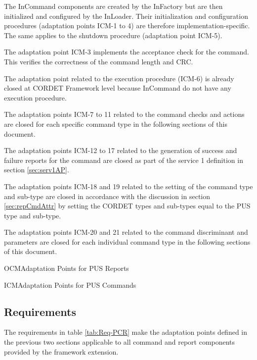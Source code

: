 \documentclass[a4paper,10pt]{article}
\newenvironment{fw_itemize}						%
{\begin{itemize}
  \setlength{\itemsep}{1mm}
  \setlength{\parskip}{0pt}
  \setlength{\parsep}{0pt}}
{\end{itemize}}
\newenvironment{cr_ap}[2]
{
\begin{longtable}{|l|p{4.7cm}|p{6.9cm}|}
\caption{#2}\label{tab:AP-#1} \\
\hline
\rowcolor{light-gray}
\textbf{AP ID} & \textbf{Adaptation Point} & \textbf{Close-Out Value}\\
\hline\hline
\endfirsthead
\rowcolor{light-gray}
\textbf{AP ID} & \textbf{Adaptation Point} & \textbf{Close-Out Value}\\
\hline\hline
\endhead
\DTLforeach*[\DTLiseq{\cat}{#1}]{dbAP}{\cat=Category,\origin=Origin,\id=Id,\ap=AP,\defValue=DefValue}
{\DTLiffirstrow{}{\\\hline}P-\cat-\id & \ap\ (\origin) & \defValue}\\\hline
}
{\end{longtable}}
\begin{document}
\begin{fw_itemize}
\item The InCommand components are created by the InFactory but are then initialized and configured by the InLoader. Their initialization and configuration procedures (adaptation points ICM-1 to 4) are therefore implementation-specific. The same applies to the shutdown procedure (adaptation point ICM-5).
\item The adaptation point ICM-3 implements the acceptance check for the command. This verifies the correctness of the command length and CRC.
\item The adaptation point related to the execution procedure (ICM-6) is already closed at CORDET Framework level because InCommand do not have any execution procedure.
\item The adaptation points ICM-7 to 11 related to the command checks and actions are closed for each specific command type in the following sections of this document.
\item The adaptation points ICM-12 to 17 related to the generation of success and failure reports for the command are closed as part of the service 1 definition in section \ref{sec:serv1AP}.
\item The adaptation points ICM-18 and 19 related to the setting of the command type and sub-type are closed in accordance with the discussion in section \ref{sec:repCmdAttr} by setting the CORDET types and sub-types equal to the PUS type and sub-type.
\item The adaptation points ICM-20 and 21 related to the command discriminant and parameters are closed for each individual command type in the following sections of this document.
\end{fw_itemize}

\begin{cr_ap}{OCM}{Adaptation Points for PUS Reports}
\end{cr_ap}

\newpage
\begin{cr_ap}{ICM}{Adaptation Points for PUS Commands}
\end{cr_ap}

\subsection{Requirements}\label{sec:repCmdReq}
The requirements in table \ref{tab:Req-PCR} make the adaptation points defined in the previous two sections applicable to all command and report components provided by the framework extension.
\end{document}
